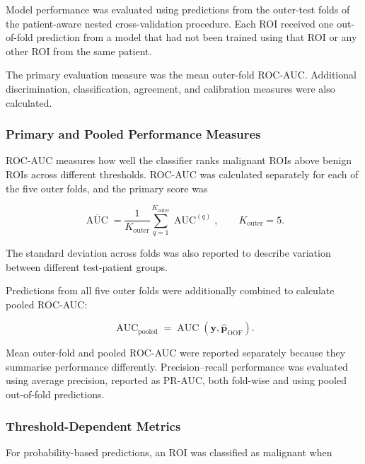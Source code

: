 \documentclass[12pt,twocolumn]{article}
\begin{document}
Model performance was evaluated using predictions from the outer-test
folds of the patient-aware nested cross-validation procedure. Each ROI
received one out-of-fold prediction from a model that had not been
trained using that ROI or any other ROI from the same patient.

The primary evaluation measure was the mean outer-fold ROC-AUC.
Additional discrimination, classification, agreement, and calibration
measures were also calculated.

\subsubsection{Primary and Pooled Performance Measures}
\label{subsubsec:primary_performance_measure}

ROC-AUC measures how well the classifier ranks malignant ROIs above
benign ROIs across different thresholds. ROC-AUC was calculated
separately for each of the five outer folds, and the primary score was

\begin{equation}
\overline{\operatorname{AUC}}
=
\frac{1}{K_{\mathrm{outer}}}
\sum_{q=1}^{K_{\mathrm{outer}}}
\operatorname{AUC}^{(q)},
\qquad
K_{\mathrm{outer}}=5.
\label{eq:mean_outer_auc}
\end{equation}

The standard deviation across folds was also reported to describe
variation between different test-patient groups.

Predictions from all five outer folds were additionally combined to
calculate pooled ROC-AUC:

\begin{equation}
\operatorname{AUC}_{\mathrm{pooled}}
=
\operatorname{AUC}
\left(
\mathbf{y},
\widehat{\mathbf{p}}_{\mathrm{OOF}}
\right).
\label{eq:pooled_auc}
\end{equation}

Mean outer-fold and pooled ROC-AUC were reported separately because
they summarise performance differently. Precision--recall performance
was evaluated using average precision, reported as PR-AUC, both
fold-wise and using pooled out-of-fold predictions.

\subsubsection{Threshold-Dependent Metrics}
\label{subsubsec:threshold_metrics}

For probability-based predictions, an ROI was classified as malignant
when
\end{document}
